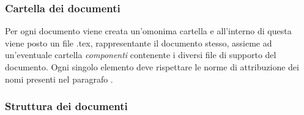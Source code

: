 \subsubsection{Cartella dei documenti}
\label{ssub:cartella_doc}

Per ogni documento viene creata un'omonima cartella e all'interno di questa viene posto un file .tex, rappresentante il 
documento stesso, assieme ad un'eventuale cartella \emph{componenti} contenente i diversi file di supporto del documento. 
Ogni singolo elemento deve rispettare le norme di attribuzione dei nomi presenti nel paragrafo .

\subsubsection{Struttura dei documenti}
\label{ssub:struttura_doc}

